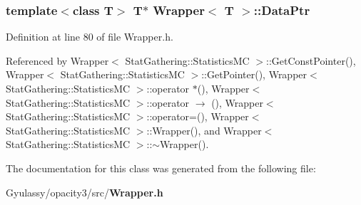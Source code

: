 \subsubsection{\setlength{\rightskip}{0pt plus 5cm}template$<$class T$>$ T$\ast$ {\bf Wrapper}$<$ T $>$::{\bf DataPtr}\hspace{0.3cm}{\tt  [private]}}\label{classWrapper_fa8d2e17d834993a45bcc1811c5945d8}




Definition at line 80 of file Wrapper.h.

Referenced by Wrapper$<$ StatGathering::StatisticsMC $>$::GetConstPointer(), Wrapper$<$ StatGathering::StatisticsMC $>$::GetPointer(), Wrapper$<$ StatGathering::StatisticsMC $>$::operator $\ast$(), Wrapper$<$ StatGathering::StatisticsMC $>$::operator $\rightarrow$ (), Wrapper$<$ StatGathering::StatisticsMC $>$::operator=(), Wrapper$<$ StatGathering::StatisticsMC $>$::Wrapper(), and Wrapper$<$ StatGathering::StatisticsMC $>$::$\sim$Wrapper().

The documentation for this class was generated from the following file:\begin{CompactItemize}
\item 
Gyulassy/opacity3/src/{\bf Wrapper.h}\end{CompactItemize}
